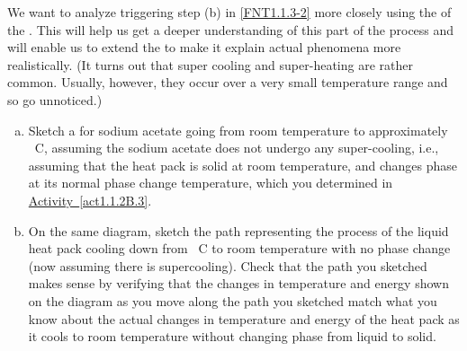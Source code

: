 \label{FNT1.1.3-3}

We want to analyze triggering step (b) in \ref{FNT1.1.3-2} more closely using the \TempGraph{} of the \ThreePhaseModel{}. This will help us get a deeper understanding of this part of the process and will enable us to extend the \ThreePhaseModel{} to make it explain actual phenomena more realistically. (It turns out that super cooling and super-heating are rather common. Usually, however, they occur over a very small temperature range and so go unnoticed.)

\begin{enumerate}[(a)]
	\item Sketch a \TempGraph{} for sodium acetate going from room temperature to approximately \unit[150]{\textdegree C}, assuming the sodium acetate does not undergo any super-cooling, i.e., assuming that the heat pack is solid at room temperature, and changes phase at its normal phase change temperature, which you determined in \hyperref[act1.1.2]{Activity~\ref*{act1.1.2B.3}}.
	
	\item On the same diagram, sketch the path representing the process of the liquid heat pack cooling down from \unit[150]{\textdegree C} to room temperature with no phase change (now assuming there is supercooling). Check that the path you sketched makes sense by verifying that the changes in temperature and energy shown on the diagram as you move along the path you sketched match what you know about the actual changes in temperature and energy of the heat pack as it cools to room temperature without changing phase from liquid to solid.
\end{enumerate}